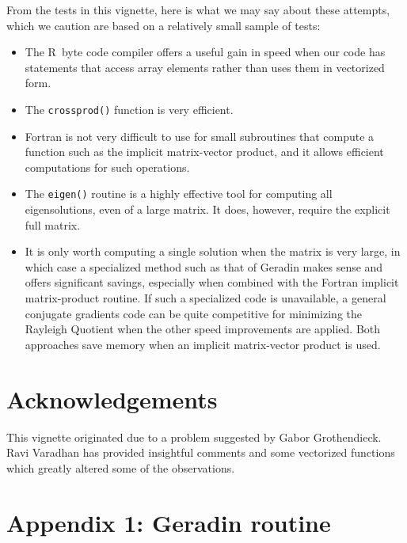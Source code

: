 \documentclass[10pt]{article}\usepackage[]{graphicx}\usepackage[]{color}
\newcommand{\R}{{\sf R\ }}
\newcommand{\code}[1]{{\tt #1}}
\begin{document}
From the tests in this vignette, here is what we may say about these
attempts, which we caution are based on a relatively small sample of
tests:

\begin{itemize}
\item{The \R byte code compiler offers a useful gain in speed when 
our code has statements that access array elements rather than uses
them in vectorized form.}
\item{The \code{crossprod()} function is very efficient.}
\item{Fortran is not very difficult to use for small subroutines
that compute a function such as the implicit matrix-vector product, 
and it allows efficient computations for such operations.}
\item{The \code{eigen()} routine is a highly effective tool for
computing all eigensolutions, even of a large matrix. It does,
however, require the explicit full matrix.}
\item{It is only
worth computing a single solution when the matrix is very large,
in which case a specialized method such as that of Geradin makes
sense and offers significant savings, especially when combined with
the Fortran implicit matrix-product routine. If such a specialized
code is unavailable, a general conjugate gradients code can be quite
competitive for minimizing the Rayleigh Quotient when the other
speed improvements are applied. Both approaches save memory when
an implicit matrix-vector product is used.}
\end{itemize}

\section*{Acknowledgements}

This vignette originated due to a problem suggested by Gabor Grothendieck. Ravi Varadhan
has provided insightful comments and some vectorized functions which
greatly altered some of the observations.



\section*{Appendix 1: Geradin routine}
\end{document}
